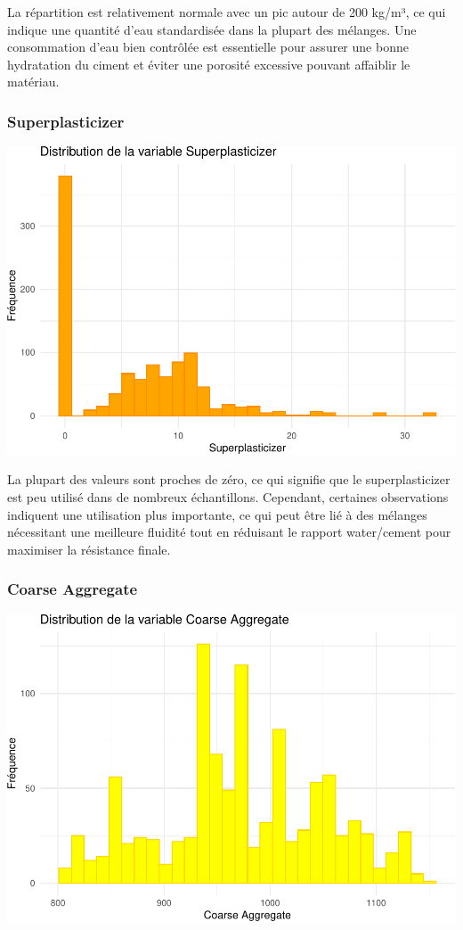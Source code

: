 \documentclass[
  12pt,
]{article}
\begin{document}
La répartition est relativement normale avec un pic autour de 200 kg/m³,
ce qui indique une quantité d'eau standardisée dans la plupart des
mélanges. Une consommation d'eau bien contrôlée est essentielle pour
assurer une bonne hydratation du ciment et éviter une porosité excessive
pouvant affaiblir le matériau.

\subsubsection{Superplasticizer}\label{superplasticizer}

\includegraphics{rmd_final_files/figure-latex/unnamed-chunk-5-1.pdf}

La plupart des valeurs sont proches de zéro, ce qui signifie que le
superplasticizer est peu utilisé dans de nombreux échantillons.
Cependant, certaines observations indiquent une utilisation plus
importante, ce qui peut être lié à des mélanges nécessitant une
meilleure fluidité tout en réduisant le rapport water/cement pour
maximiser la résistance finale.

\subsubsection{Coarse Aggregate}\label{coarse-aggregate}

\includegraphics{rmd_final_files/figure-latex/unnamed-chunk-6-1.pdf}
\end{document}
